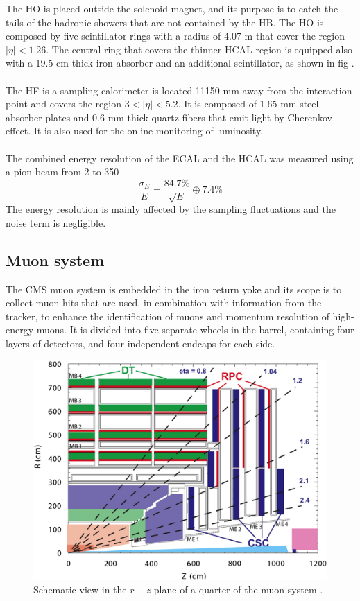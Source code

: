 The HO is placed outside the solenoid magnet, and its purpose is to catch the tails of the hadronic showers that are not contained by the HB. The HO is composed by five scintillator rings with a radius of 4.07 m that cover the region $|\eta|<1.26$. The central ring that covers the thinner HCAL region is equipped also with a 19.5 cm thick iron absorber and an additional scintillator, as shown in fig .\\
\\
The HF is a sampling calorimeter is located 11150 mm away from the interaction point and covers the region $3<|\eta|<5.2$. It is composed of 1.65 mm steel absorber plates and 0.6 mm thick quartz fibers that emit light by Cherenkov effect. It is also used for the online monitoring of luminosity.
\\
\\
The combined energy resolution of the ECAL and the HCAL was measured using a pion beam from 2 \GeV to 350 \GeV \cite{Abdullin2008TheGeV/c}
\begin{equation}
    \frac{\sigma_E}{E}= \frac{84.7\%}{\sqrt{E}} \oplus 7.4 \%
\end{equation}
The energy resolution is mainly affected by the sampling fluctuations and the noise term is negligible.

\subsection{Muon system}
The CMS muon system \cite{Layter1997TheReport} is embedded in the iron return yoke and its scope is to collect muon hits that are used, in combination with information from the tracker, to enhance the identification of muons and momentum resolution of high-energy muons.
It is divided into five separate wheels in the barrel, containing four layers of detectors, and four independent endcaps for each side.

\begin{figure}[h!]
    \centering
    \includegraphics[width=0.85\linewidth]{fig//chap03-cms/muon_system.jpg}
    \caption{Schematic view in the $r-z$ plane of a quarter of the muon system \cite{Piccolo2011CMSPerformance}.}
    \label{fig:muon_system}
\end{figure}


